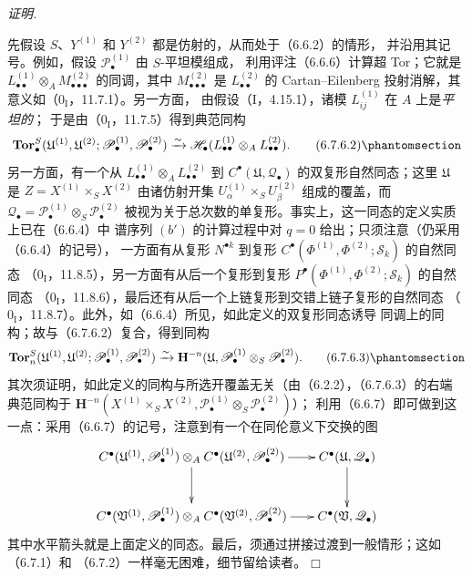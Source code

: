 \documentclass[UTF8,fontset=none,11pt,oneside,openany]{ctexbook}
\providecommand{\square}{\mdlgwhtsquare}
\newenvironment{proof}{%
  \par\smallskip\noindent\textit{证明.}\ %
}{\hfill$\square$\par}
\newcommand{\oldpage}[2][]{%
  \hypertarget{ega-source-page-#1-#2}{}%
  \marginnote{\scriptsize\textbf{#1}~|~#2}\ignorespaces}
\let\EGAOriginalLabel\label
\renewcommand{\label}[1]{\phantomsection\EGAOriginalLabel{#1}}
\begin{document}
\begin{proof}
先假设 $S$、$Y^{(1)}$ 和 $Y^{(2)}$ 都是仿射的，从而处于（6.6.2）的情形，
并沿用其记号。例如，假设 $\mathscr P_\bullet^{(1)}$ 由 $S$-平坦模组成，
利用评注（6.6.6）计算超 Tor；它就是
$L_{\bullet\bullet}^{(1)}\otimes_A M_{\bullet\bullet\bullet}^{(2)}$ 的同调，其中
$M_{\bullet\bullet\bullet}^{(2)}$ 是 $L_{\bullet\bullet}^{(2)}$ 的
Cartan--Eilenberg 投射消解，其意义如（$0_{\mathrm I}$，11.7.1）。另一方面，
由假设（I，4.15.1），诸模 $L_{ij}^{(1)}$ 在 $A$ 上是\emph{平坦的}；
于是由（$0_{\mathrm I}$，11.7.5）得到典范同构
\[
  \mathbf{Tor}_\bullet^S
  (\mathfrak U^{(1)},\mathfrak U^{(2)};
   \mathscr P_\bullet^{(1)},\mathscr P_\bullet^{(2)})
  \xrightarrow{\sim}
  \mathscr H_\bullet
  (L_{\bullet\bullet}^{(1)}\otimes_A L_{\bullet\bullet}^{(2)}).
  \tag{6.7.6.2}\label{III.6.7.6.2.fr}
\]
另一方面，有一个从
$L_{\bullet\bullet}^{(1)}\otimes_A L_{\bullet\bullet}^{(2)}$ 到
$C^\bullet(\mathfrak U,\mathscr Q_\bullet)$ 的双复形自然同态；这里
$\mathfrak U$ 是 $Z=X^{(1)}\times_S X^{(2)}$ 由诸仿射开集
\oldpage[III]{161}
$U_\alpha^{(1)}\times_S U_\beta^{(2)}$ 组成的覆盖，而
$\mathscr Q_\bullet
=\mathscr P_\bullet^{(1)}\otimes_S\mathscr P_\bullet^{(2)}$
被视为关于总次数的单复形。事实上，这一同态的定义实质上已在（6.6.4）中
谱序列 $(b')$ 的计算过程中对 $q=0$ 给出；只须注意（仍采用（6.6.4）的记号），
一方面有从复形 $N^{\bullet k}$ 到复形
$C^\bullet(\Phi^{(1)},\Phi^{(2)};\mathscr S_k)$ 的自然同态
（$0_{\mathrm I}$，11.8.5），另一方面有从后一个复形到复形
$P^\bullet(\Phi^{(1)},\Phi^{(2)};\mathscr S_k)$ 的自然同态
（$0_{\mathrm I}$，11.8.6），最后还有从后一个上链复形到交错上链子复形的自然同态
（$0_{\mathrm I}$，11.8.7）。此外，如（6.6.4）所见，如此定义的双复形同态诱导
同调上的同构；故与（6.7.6.2）复合，得到同构
\[
  \mathbf{Tor}_n^S
  (\mathfrak U^{(1)},\mathfrak U^{(2)};
   \mathscr P_\bullet^{(1)},\mathscr P_\bullet^{(2)})
  \xrightarrow{\sim}
  \mathbf H^{-n}
  (\mathfrak U,\mathscr P_\bullet^{(1)}\otimes_S\mathscr P_\bullet^{(2)}).
  \tag{6.7.6.3}\label{III.6.7.6.3.fr}
\]
其次须证明，如此定义的同构与所选开覆盖无关（由（6.2.2），（6.7.6.3）的右端
典范同构于
$\mathbf H^{-n}
(X^{(1)}\times_S X^{(2)},
 \mathscr P_\bullet^{(1)}\otimes_S\mathscr P_\bullet^{(2)})$）；
利用（6.6.7）即可做到这一点：采用（6.6.7）的记号，注意到有一个在同伦意义下交换的图
\[
\xymatrix@C=18pt@R=28pt{
  C^\bullet(\mathfrak U^{(1)},\mathscr P_\bullet^{(1)})
  \otimes_A
  C^\bullet(\mathfrak U^{(2)},\mathscr P_\bullet^{(2)})
  \ar[r]\ar[d]
  & C^\bullet(\mathfrak U,\mathscr Q_\bullet)\ar[d]
  \\
  C^\bullet(\mathfrak V^{(1)},\mathscr P_\bullet^{(1)})
  \otimes_A
  C^\bullet(\mathfrak V^{(2)},\mathscr P_\bullet^{(2)})
  \ar[r]
  & C^\bullet(\mathfrak V,\mathscr Q_\bullet)
}
\]
其中水平箭头就是上面定义的同态。最后，须通过拼接过渡到一般情形；这如（6.7.1）和
（6.7.2）一样毫无困难，细节留给读者。
\end{proof}
\end{document}
